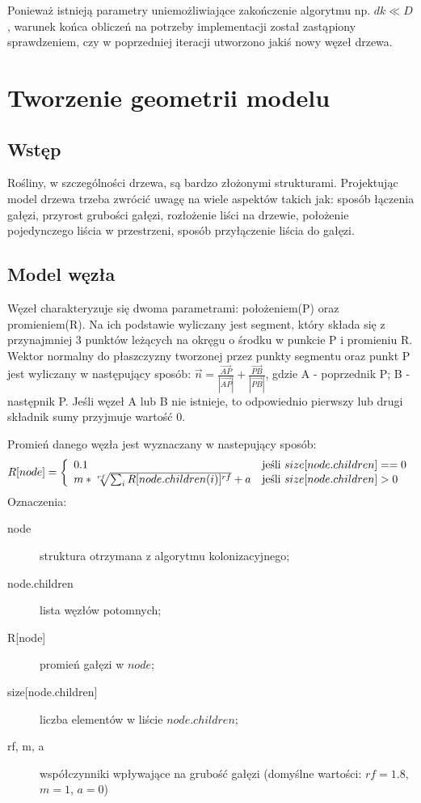 Ponieważ istnieją parametry uniemożliwiające zakończenie algorytmu np. $dk \ll D$, warunek końca obliczeń na potrzeby implementacji został zastąpiony sprawdzeniem, czy w poprzedniej iteracji utworzono jakiś nowy węzeł drzewa.

\section{Tworzenie geometrii modelu}
\subsection{Wstęp}
Rośliny, w szczególności drzewa, są bardzo złożonymi strukturami. Projektując model drzewa trzeba zwrócić uwagę na wiele aspektów takich jak: sposób łączenia gałęzi, przyrost grubości gałęzi, rozłożenie liści na drzewie, położenie pojedynczego liścia w przestrzeni, sposób przyłączenie liścia do gałęzi.


\subsection{Model węzła}

\label{subsec:node_model}

Węzeł charakteryzuje się dwoma parametrami: położeniem(P) oraz promieniem(R). Na ich podstawie wyliczany jest segment, który składa się z przynajmniej 3 punktów leżących na okręgu o środku w punkcie P i promieniu R. Wektor normalny do płaszczyzny tworzonej przez punkty segmentu oraz punkt P jest wyliczany w następujący sposób: $\vec{n}=\frac{\vec{AP}}{|\vec{AP}|}+\frac{\vec{PB}}{|\vec{PB}|}$, gdzie A - poprzednik P; B - następnik P. Jeśli węzeł A lub B nie istnieje, to odpowiednio pierwszy lub drugi składnik sumy przyjmuje wartość 0.

Promień danego węzła jest wyznaczany w nastepujący sposób:
$$
  R[node] = \left\{ 
  \begin{array}{l l}
    0.1 & \textrm{jeśli $size[node.children] == 0$}\\
    m*\sqrt[rf]{\sum_{i} R[node.children(i)]^{rf}}+a & \textrm{jeśli $size[node.children] > 0$}\\
  \end{array} \right.
$$
Oznaczenia:
\begin{description}
	\item[node] struktura otrzymana z algorytmu kolonizacyjnego;
	\item[node.children] lista węzłów potomnych;
	\item[\textrm{R[node]}] promień gałęzi w $node$;
	\item[\textrm{size[node.children]}] liczba elementów w liście $node.children$;
	\item[rf, m, a] współczynniki wpływające na grubość gałęzi (domyślne wartości: $rf=1.8$, $m=1$, $a=0$)
\end{description}

